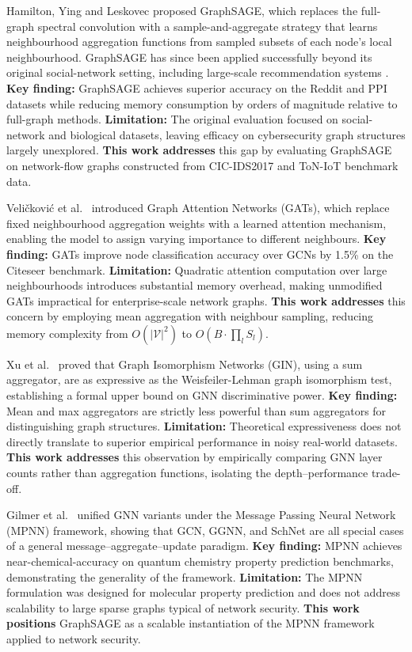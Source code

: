 \documentclass[conference]{IEEEtran}
\begin{document}
Hamilton, Ying and Leskovec \cite{hamilton2017} proposed GraphSAGE, which
replaces the full-graph spectral convolution with a sample-and-aggregate
strategy that learns neighbourhood aggregation functions from sampled subsets of
each node's local neighbourhood. GraphSAGE has since been applied successfully
beyond its original social-network setting, including large-scale recommendation
systems \cite{ying2018graphsage_rec}. \textbf{Key finding:} GraphSAGE achieves
superior accuracy on the Reddit and PPI datasets while reducing memory
consumption by orders of magnitude relative to full-graph methods.
\textbf{Limitation:} The original evaluation focused on social-network and
biological datasets, leaving efficacy on cybersecurity graph structures largely
unexplored. \textbf{This work addresses} this gap by evaluating GraphSAGE on
network-flow graphs constructed from CIC-IDS2017 and ToN-IoT benchmark data.

Veli\v{c}kovi\'{c} et al.~\cite{velickovic2018} introduced Graph Attention
Networks (GATs), which replace fixed neighbourhood aggregation weights with a
learned attention mechanism, enabling the model to assign varying importance to
different neighbours. \textbf{Key finding:} GATs improve node classification
accuracy over GCNs by 1.5\% on the Citeseer benchmark.
\textbf{Limitation:} Quadratic attention computation over large neighbourhoods
introduces substantial memory overhead, making unmodified GATs impractical for
enterprise-scale network graphs. \textbf{This work addresses} this concern by
employing mean aggregation with neighbour sampling, reducing memory complexity
from $O(|\mathcal{V}|^2)$ to $O(B \cdot \prod_l S_l)$.

Xu et al.~\cite{xu2019gin} proved that Graph Isomorphism Networks (GIN), using
a sum aggregator, are as expressive as the Weisfeiler-Lehman graph isomorphism
test, establishing a formal upper bound on GNN discriminative power.
\textbf{Key finding:} Mean and max aggregators are strictly less powerful than
sum aggregators for distinguishing graph structures. \textbf{Limitation:}
Theoretical expressiveness does not directly translate to superior empirical
performance in noisy real-world datasets. \textbf{This work addresses} this
observation by empirically comparing GNN layer counts rather than aggregation
functions, isolating the depth--performance trade-off.

Gilmer et al.~\cite{gilmer2017} unified GNN variants under the Message Passing
Neural Network (MPNN) framework, showing that GCN, GGNN, and SchNet are all
special cases of a general message--aggregate--update paradigm.
\textbf{Key finding:} MPNN achieves near-chemical-accuracy on quantum chemistry
property prediction benchmarks, demonstrating the generality of the framework.
\textbf{Limitation:} The MPNN formulation was designed for molecular property
prediction and does not address scalability to large sparse graphs typical of
network security. \textbf{This work positions} GraphSAGE as a scalable
instantiation of the MPNN framework applied to network security.
\end{document}
